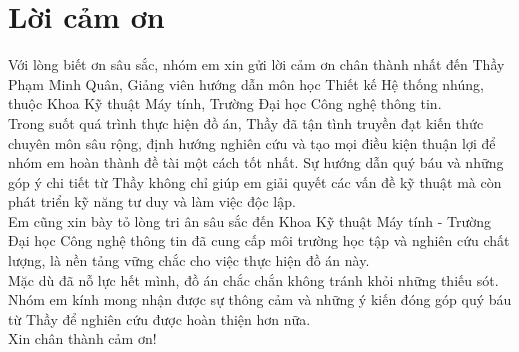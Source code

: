 \chapter*{\centering\Large{Lời cảm ơn}}

Với lòng biết ơn sâu sắc, nhóm em xin gửi lời cảm ơn chân thành nhất đến Thầy Phạm Minh Quân, Giảng viên hướng dẫn môn học Thiết kế Hệ thống nhúng, thuộc Khoa Kỹ thuật Máy tính, Trường Đại học Công nghệ thông tin.\\
\indent Trong suốt quá trình thực hiện đồ án, Thầy đã tận tình truyền đạt kiến thức chuyên môn sâu rộng, định hướng nghiên cứu và tạo mọi điều kiện thuận lợi để nhóm em hoàn thành đề tài một cách tốt nhất. Sự hướng dẫn quý báu và những góp ý chi tiết từ Thầy không chỉ giúp em giải quyết các vấn đề kỹ thuật mà còn phát triển kỹ năng tư duy và làm việc độc lập.\\
\indent Em cũng xin bày tỏ lòng tri ân sâu sắc đến Khoa Kỹ thuật Máy tính - Trường Đại học Công nghệ thông tin đã cung cấp môi trường học tập và nghiên cứu chất lượng, là nền tảng vững chắc cho việc thực hiện đồ án này.\\
\indent Mặc dù đã nỗ lực hết mình, đồ án chắc chắn không tránh khỏi những thiếu sót. Nhóm em kính mong nhận được sự thông cảm và những ý kiến đóng góp quý báu từ Thầy để nghiên cứu được hoàn thiện hơn nữa.\\
Xin chân thành cảm ơn!


